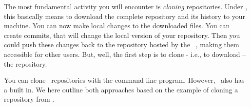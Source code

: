 %
\label{sec:gitClone}%
%
The most fundamental activity you will encounter is \emph{cloning} repositories.
Under \git, this basically means to download the complete repository and its history to your machine.
You can now make local changes to the downloaded files.
You can create commits, that will change the local version of your repository.
Then you could push these changes back to the repository hosted by the \git\ , making them accessible for other users.
But, well, the first step is to clone - i.e., to download -- the repository.

You can clone \git\ repositories with the command line   program.
However, \pycharm\ also has a \git {} built in.
We here outline both approaches based on the example of cloning a repository from \github{}.%
%
%
%
%
\endhsection%
